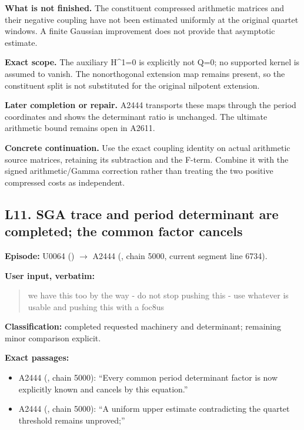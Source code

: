 \textbf{What is not finished.} The constituent compressed arithmetic
matrices and their negative coupling have not been estimated uniformly
at the original quartet windows. A finite Gaussian improvement does not
provide that asymptotic estimate.

\textbf{Exact scope.} The auxiliary H\^{}1=0 is explicitly not Q=0; no
supported kernel is assumed to vanish. The nonorthogonal extension map
remains present, so the constituent split is not substituted for the
original nilpotent extension.

\textbf{Later completion or repair.} A2444 transports these maps through
the period coordinates and shows the determinant ratio is unchanged. The
ultimate arithmetic bound remains open in A2611.

\textbf{Concrete continuation.} Use the exact coupling identity on
actual arithmetic source matrices, retaining its subtraction and the
F-term. Combine it with the signed arithmetic/Gamma correction rather
than treating the two positive compressed costs as independent.

\subsection{L11. SGA trace and period determinant are completed; the
common factor
cancels}\label{TranscriptLedgerStage:l11.-sga-trace-and-period-determinant-are-completed-the-common-factor-cancels}

\textbf{Episode:} U0064
(\protect{})
\allowbreak{}\ensuremath{→}\allowbreak{} A2444
(\protect{}, chain 5000,
current segment line 6734).

\textbf{User input, verbatim:}

\begin{quote}
we have this too by the way - do not stop pushing this - use whatever is
usable and pushing this with a foc8us
\end{quote}

\textbf{Classification:} completed requested machinery and determinant;
remaining minor comparison explicit.

\textbf{Exact passages:}

\begin{itemize}
\tightlist
\item
  A2444 (\protect{}, chain
  5000): ``Every common period determinant factor is now explicitly
  known and cancels by this equation.''
\item
  A2444 (\protect{}, chain
  5000): ``A uniform upper estimate contradicting the quartet threshold
  remains unproved;''
\end{itemize}

